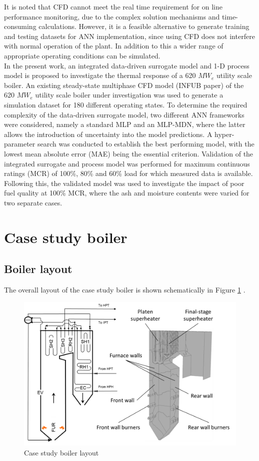 \documentclass[a4paper,fleqn]{cas-dc}
\begin{document}
It is noted that CFD cannot meet the real time requirement for on line performance monitoring, due to the complex solution mechanisms and time-consuming calculations. However, it is a feasible alternative to generate training and testing datasets for ANN implementation, since using CFD does not interfere with normal operation of the plant. In addition to this a wider range of appropriate operating conditions can be simulated.\\
 
In the present work, an integrated data-driven surrogate model and 1-D process model is proposed to investigate the thermal response of a 620 $MW_e$ utility scale boiler. An existing steady-state multiphase CFD model (INFUB paper) of the 620 $MW_e$ utility scale boiler under investigation was used to generate a simulation dataset for 180 different operating states. To determine the required complexity of the data-driven surrogate model, two different ANN frameworks were considered, namely a standard MLP and an MLP-MDN, where the latter allows the introduction of uncertainty into the model predictions. A hyper-parameter search was conducted to establish the best performing model, with the lowest mean absolute error (MAE) being the essential criterion. Validation of the integrated surrogate and process model was performed for maximum continuous ratings (MCR) of 100\%, 80\% and 60\% load for which measured data is available. Following this, the validated model was used to investigate the impact of poor fuel quality at 100\% MCR, where the ash and moisture contents were varied for two separate cases.

\section{Case study boiler}

\subsection{Boiler layout}
The overall layout of the case study boiler is shown schematically in Figure \ref{fig_case_layout} \cite{Rousseau2020}.

\begin{figure}[h!]
	\centering
		\includegraphics[scale=0.5]{CASE_STUDY_BOILER}
	  \caption{Case study boiler layout \citep{Rousseau2020}}\label{fig_case_layout}
\end{figure}
\end{document}
